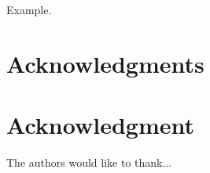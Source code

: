 \documentclass[10pt,journal,compsoc]{IEEEtran}
\begin{document}
Example.


\ifCLASSOPTIONcompsoc
  \section*{Acknowledgments}
\else
  \section*{Acknowledgment}
\fi


The authors would like to thank...


\ifCLASSOPTIONcaptionsoff
  \newpage
\fi





%
%
%



%
\end{document}

